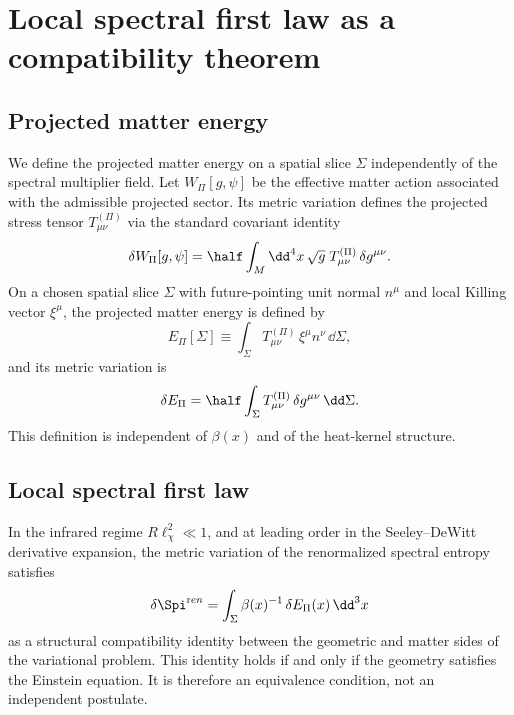 \section{Local spectral first law as a compatibility theorem}
  \label{sec:first-law}

  \subsection{Projected matter energy}
    \label{subsec:projected-matter}

    We define the projected matter energy on a spatial slice $\Sigma$ independently
    of the spectral multiplier field.
    Let $W_\Pi[g,\psi]$ be the effective matter action associated with the admissible
    projected sector.
    Its metric variation defines the projected stress tensor $T^{(\Pi)}_{\mu\nu}$ via
    the standard covariant identity
    \begin{equation}
      \delta W_\Pi[g,\psi]
      = \half\int_M \dd^4x\,\sqrt{g}\;T^{(\Pi)}_{\mu\nu}\,\delta g^{\mu\nu}.
      \label{eq:W-variation}
    \end{equation}
    On a chosen spatial slice $\Sigma$ with future-pointing unit normal $n^\mu$ and
    local Killing vector $\xi^\mu$, the projected matter energy is defined by
    \begin{equation}
      E_\Pi[\Sigma]
      \equiv
      \int_\Sigma T^{(\Pi)}_{\mu\nu}\,\xi^\mu n^\nu\,\dd\Sigma,
      \label{eq:E-Pi-def}
    \end{equation}
    and its metric variation is
    \begin{equation}
      \delta E_\Pi
      = \half\int_\Sigma T^{(\Pi)}_{\mu\nu}\,\delta g^{\mu\nu}\,\dd\Sigma.
      \label{eq:delta-E-Pi}
    \end{equation}
    This definition is independent of $\beta(x)$ and of the heat-kernel structure.

  \subsection{Local spectral first law}
    \label{subsec:first-law}

    \begin{proposition}
      \label{thm:first-law}
      In the infrared regime $R\ell_\chi^2 \ll 1$, and at leading order in the
      Seeley--DeWitt derivative expansion, the metric variation of the renormalized
      spectral entropy satisfies
      \begin{equation}
        \delta\Spi^{\mathrm ren}
        = \int_\Sigma \beta(x)^{-1}\,\delta E_\Pi(x)\,\dd^3 x
        \label{eq:first-law}
      \end{equation}
      as a structural compatibility identity between the geometric and matter sides
      of the variational problem.
      This identity holds if and only if the geometry satisfies the Einstein equation.
      It is therefore an equivalence condition, not an independent postulate.
    \end{proposition}

